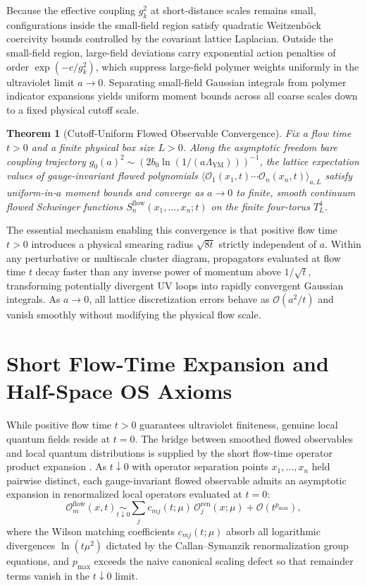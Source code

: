 \documentclass[11pt,a4paper]{article}
\newtheorem{theorem}{Theorem}[section]
\begin{document}
Because the effective coupling $g_k^2$ at short-distance scales remains small, configurations inside the small-field region satisfy quadratic Weitzenb\"ock coercivity bounds controlled by the covariant lattice Laplacian. Outside the small-field region, large-field deviations carry exponential action penalties of order $\exp(-c / g_k^2)$, which suppress large-field polymer weights uniformly in the ultraviolet limit $a \to 0$. Separating small-field Gaussian integrals from polymer indicator expansions yields uniform moment bounds across all coarse scales down to a fixed physical cutoff scale.

\begin{theorem}[Cutoff-Uniform Flowed Observable Convergence]
Fix a flow time $t > 0$ and a finite physical box size $L > 0$. Along the asymptotic freedom bare coupling trajectory $g_0(a)^2 \sim (2 b_0 \ln(1 / (a\Lambda_{\mathrm{YM}})))^{-1}$, the lattice expectation values of gauge-invariant flowed polynomials $\langle \mathcal{O}_1(x_1, t) \cdots \mathcal{O}_n(x_n, t) \rangle_{a, L}$ satisfy uniform-in-$a$ moment bounds and converge as $a \to 0$ to finite, smooth continuum flowed Schwinger functions $S_n^{\mathrm{flow}}(x_1, \dots, x_n; t)$ on the finite four-torus $T_L^4$.
\end{theorem}

The essential mechanism enabling this convergence is that positive flow time $t > 0$ introduces a physical smearing radius $\sqrt{8t}$ strictly independent of $a$. Within any perturbative or multiscale cluster diagram, propagators evaluated at flow time $t$ decay faster than any inverse power of momentum above $1/\sqrt{t}$, transforming potentially divergent UV loops into rapidly convergent Gaussian integrals. As $a \to 0$, all lattice discretization errors behave as $\mathcal{O}(a^2 / t)$ and vanish smoothly without modifying the physical flow scale.

\section{Short Flow-Time Expansion and Half-Space OS Axioms}
While positive flow time $t > 0$ guarantees ultraviolet finiteness, genuine local quantum fields reside at $t = 0$. The bridge between smoothed flowed observables and local quantum distributions is supplied by the short flow-time operator product expansion \cite{LuscherWeisz2011JHEP}. As $t \downarrow 0$ with operator separation points $x_1, \dots, x_n$ held pairwise distinct, each gauge-invariant flowed observable admits an asymptotic expansion in renormalized local operators evaluated at $t = 0$:
\begin{equation}
\mathcal{O}^{\mathrm{flow}}_m(x, t) \underset{t \downarrow 0}{\sim} \sum_j c_{mj}(t; \mu) \, \mathcal{O}^{\mathrm{ren}}_j(x; \mu) + \mathcal{O}(t^{p_{\max}}),
\end{equation}
where the Wilson matching coefficients $c_{mj}(t; \mu)$ absorb all logarithmic divergences $\ln(t \mu^2)$ dictated by the Callan--Symanzik renormalization group equations, and $p_{\max}$ exceeds the naive canonical scaling defect so that remainder terms vanish in the $t \downarrow 0$ limit.
\end{document}
